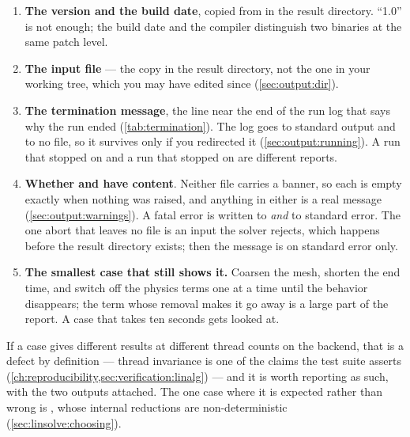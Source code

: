 \begin{enumerate}
  \item \textbf{The version and the build date}, copied from
     in the result directory. ``1.0'' is not enough; the build
    date and the compiler distinguish two binaries at the same patch level.
  \item \textbf{The input file} --- the copy in the result directory, not the
    one in your working tree, which you may have edited since
    (\cref{sec:output:dir}).
  \item \textbf{The termination message}, the line near the end of the run
    log that says why the run ended (\cref{tab:termination}). The log goes to standard output and to no file,
    so it survives only if you redirected it (\cref{sec:output:running}). A
    run that stopped on  and a run that stopped on
     are different reports.
  \item \textbf{Whether  and  have
    content}. Neither file carries a banner, so each is empty exactly when
    nothing was raised, and anything in either is a real message
    (\cref{sec:output:warnings}). A fatal error is written to
     \emph{and} to standard error. The one abort that
    leaves no file is an input the solver rejects, which happens before the
    result directory exists; then the message is on standard error only.
  \item \textbf{The smallest case that still shows it.} Coarsen the mesh,
    shorten the end time, and switch off the physics terms one at a time until
    the behavior disappears; the term whose removal makes it go away is a
    large part of the report. A case that takes ten seconds gets looked at.
\end{enumerate}

\begin{note}
  If a case gives different results at different thread counts on the
   backend, that is a defect by definition
  --- thread invariance is one of the claims the test suite asserts
  (\cref{ch:reproducibility,sec:verification:linalg}) --- and it is worth
  reporting as such, with the two  outputs attached. The one
  case where it is expected rather than wrong is , whose internal
  reductions are non-deterministic (\cref{sec:linsolve:choosing}).
\end{note}
